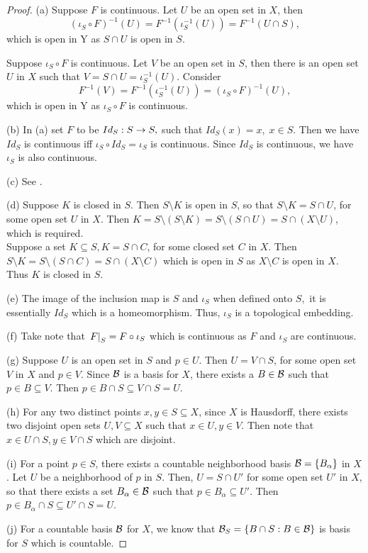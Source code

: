 \documentclass[11pt,a4paper]{article}
\begin{document}
\begin{proof}
(a) \forward Suppose $F$ is continuous. Let $U$ be an open set in $X$, then 
\begin{equation*}
(\iota_S\circ F)^{-1}(U) = F^{-1}(\iota_S^{-1}(U)) = F^{-1}(U\cap S),
\end{equation*}
which is open in Y as $S\cap U$ is open in $S$.

\noindent\converse Suppose $\iota_S\circ F$ is continuous. Let $V$ be an open set in $S$, then there is an open set $U$ in $X$ such that $V = S\cap U = \iota_S^{-1}(U)$. Consider
\begin{equation*}
F^{-1}(V) = F^{-1}(\iota_S^{-1}(U)) = (\iota_S\circ F)^{-1}(U),
\end{equation*}
which is open in Y as $\iota_S\circ F$ is continuous.

\noindent(b) In (a) set $F$ to be $Id_S:S\rightarrow S,$ such that $Id_S(x) = x,\;x\in S$. Then we have $Id_S$ is continuous iff $\iota_S\circ Id_S = \iota_S$ is continuous. Since $Id_S$ is continuous, we have $\iota_S$ is also continuous.

\noindent(c) See \cite[Thm. 3.24]{JohnLee}.

\noindent(d) \forward Suppose $K$ is closed in $S$. Then $S\setminus K$ is open in $S$, so that $S\setminus K = S\cap U$, for some open set $U$ in $X$. Then 
$K = S\setminus (S\setminus K) = S \setminus (S\cap U) = S\cap (X\setminus U)$,
which is required.\\
\converse Suppose a set $K\subseteq S, K = S\cap C$, for some closed set $C$ in $X$. Then $S\setminus K = S\setminus (S\cap C) = S\cap(X\setminus C)$ which is open in $S$ as $X\setminus C$ is open in $X$. Thus $K$ is closed in $S$.

\noindent(e) The image of the inclusion map is $S$ and $\iota_S$ when defined onto $S,$ it is essentially $Id_S$ which is a homeomorphism. Thus, $\iota_S$ is a topological embedding.

\noindent(f) Take note that $\left.F\right|_{S} = F\circ\iota_S$ which is continuous as $F$ and $\iota_S$ are continuous.

\noindent(g) Suppose $U$ is an open set in $S$ and $p\in U$. Then $U = V\cap S$, for some open set $V$ in $X$ and $p\in V$. Since $\mathcal{B}$ is a basis for $X$, there exists a $B\in \mathcal{B}$ such that $p\in B\subseteq V$. Then $p\in B\cap S\subseteq V\cap S = U$.

\noindent(h) For any two distinct points $x,y\in S\subseteq X$, since $X$ is Hausdorff, there exists two disjoint open sets $U, V\subseteq X$ such that $x\in U, y\in V$. Then note that $x\in U\cap S, y\in V\cap S$ which are disjoint.

\noindent(i) For a point $p\in S$, there exists a countable neighborhood basis $\mathcal{B} = \{B_\alpha\}$ in $X$. Let $U$ be a neighborhood of $p$ in $S$. Then, $U = S\cap U'$ for some open set $U'$ in $X$, so that there exists a set $B_\alpha\in \mathcal{B}$ such that $p\in B_\alpha\subseteq U'$. Then $p\in B_\alpha\cap S \subseteq U'\cap S = U$.

\noindent(j) For a countable basis $\mathcal{B}$ for $X$, we know that $\mathcal{B}_S = \{B\cap S:B\in\mathcal{B}\}$ is basis for $S$ which is countable.
\end{proof}
\end{document}
